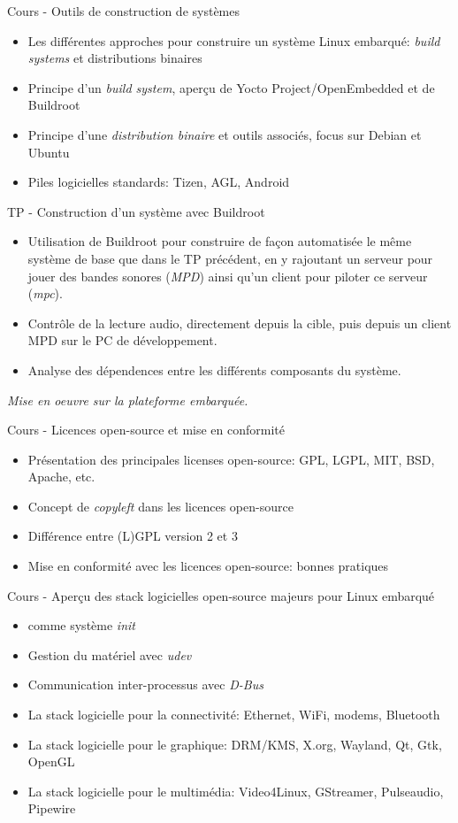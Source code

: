 \documentclass[a4paper,12pt,obeyspaces,spaces,hyphens]{article}
\begin{document}
\feagendatwocolumn
{Cours - Outils de construction de systèmes}
{
  \begin{itemize}
  \item Les différentes approches pour construire un système Linux
    embarqué: {\em build systems} et distributions binaires
  \item Principe d'un {\em build system}, aperçu de Yocto
    Project/OpenEmbedded et de Buildroot
  \item Principe d'une {\em distribution binaire} et outils associés,
    focus sur Debian et Ubuntu
  \item Piles logicielles standards: Tizen, AGL, Android
  \end{itemize}
}
{TP - Construction d'un système avec Buildroot}
{
  \begin{itemize}
  \item Utilisation de Buildroot pour construire de façon automatisée
    le même système de base que dans le TP précédent, en y rajoutant
    un serveur pour jouer des bandes sonores ({\em MPD}) ainsi
    qu'un client pour piloter ce serveur ({\em mpc}).
  \item Contrôle de la lecture audio, directement depuis la
    cible, puis depuis un client MPD sur le PC de développement.
  \item Analyse des dépendences entre les différents composants
    du système.
  \end{itemize}

  \vspace{0.5cm}
  {\em Mise en oeuvre sur la plateforme embarquée.}
}

\feagendaonecolumn
{Cours - Licences open-source et mise en conformité}
{
  \begin{itemize}
  \item Présentation des principales licenses open-source: GPL, LGPL,
    MIT, BSD, Apache, etc.
  \item Concept de {\em copyleft} dans les licences open-source
  \item Différence entre (L)GPL version 2 et 3
  \item Mise en conformité avec les licences open-source: bonnes
    pratiques
  \end{itemize}
}

\feagendaonecolumn
{Cours - Aperçu des stack logicielles open-source majeurs pour Linux embarqué}
{
  \begin{itemize}
  \item {} comme système {\em init}
  \item Gestion du matériel avec {\em udev}
  \item Communication inter-processus avec {\em D-Bus}
  \item La stack logicielle pour la connectivité: Ethernet, WiFi,
    modems, Bluetooth
  \item La stack logicielle pour le graphique: DRM/KMS, X.org,
    Wayland, Qt, Gtk, OpenGL
  \item La stack logicielle pour le multimédia: Video4Linux,
    GStreamer, Pulseaudio, Pipewire
  \end{itemize}
}
\end{document}
